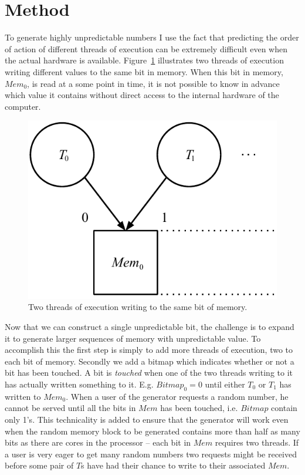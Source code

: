 \section{Method}
\label{sec:method}
To generate highly unpredictable numbers I use the fact that predicting the order of action of different threads of execution can be extremely difficult even when the actual hardware is available.
Figure~\ref{fig:TrueRand} illustrates two threads of execution writing different values to the same bit in memory.
When this bit in memory, $Mem_0$, is read at a some point in time, it is not possible to know in advance which value it contains without direct access to the internal hardware of the computer.

\begin{figure}
	\centering
		\includegraphics{image/TrueRand.pdf}
	\caption{Two threads of execution writing to the same bit of memory.}
	\label{fig:TrueRand}
\end{figure}

Now that we can construct a single unpredictable bit, the challenge is to expand it to generate larger sequences of memory with unpredictable value.
To accomplish this the first step is simply to add more threads of execution, two to each bit of memory.
Secondly we add a bitmap which indicates whether or not a bit has been touched.
A bit is \emph{touched} when one of the two threads writing to it has actually written something to it.
E.g. $Bitmap_0=0$ until either $T_0$ or $T_1$ has written to $Mem_0$.
When a user of the generator requests a random number, he cannot be served until all the bits in $Mem$ has been touched, i.e. $Bitmap$ contain only 1's.
This technicality is added to ensure that the generator will work even when the random memory block to be generated contains more than half as many bits as there are cores in the processor -- each bit in $Mem$ requires two threads.
If a user is very eager to get many random numbers two requests might be received before some pair of $T$s have had their chance to write to their associated $Mem$.

